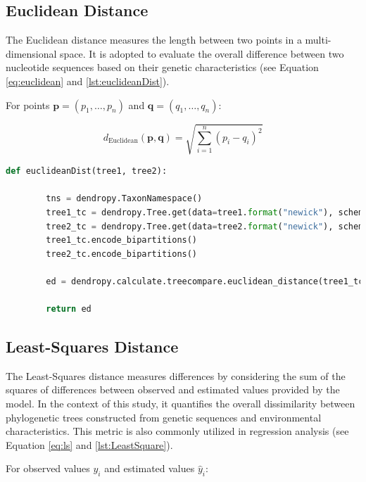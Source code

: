 \subsection{Euclidean Distance}\label{euclidean}
The Euclidean distance measures the length between two points in a multi-dimensional space. It is adopted to evaluate the overall difference between two nucleotide sequences based on their genetic characteristics (see Equation \eqref{eq:euclidean} and \autoref{lst:euclideanDist}).

For points $\mathbf{p} = (p_1, \ldots, p_n)$ and $\mathbf{q} = (q_1, \ldots, q_n)$:

\begin{equation}\label{eq:euclidean}
    d_{\text{Euclidean}}(\mathbf{p}, \mathbf{q}) = \sqrt{\sum_{i=1}^{n} (p_i - q_i)^2}
\end{equation}

\begin{lstlisting}[label=lst:euclideanDist,language=Python,caption=Python script for calculating the Euclidean distance using the ete3 package in the aPhyloGeo package]
    def euclideanDist(tree1, tree2):
        
        tns = dendropy.TaxonNamespace()
        tree1_tc = dendropy.Tree.get(data=tree1.format("newick"), schema="newick", taxon_namespace=tns)
        tree2_tc = dendropy.Tree.get(data=tree2.format("newick"), schema="newick", taxon_namespace=tns)
        tree1_tc.encode_bipartitions()
        tree2_tc.encode_bipartitions()

        ed = dendropy.calculate.treecompare.euclidean_distance(tree1_tc, tree2_tc)

        return ed
\end{lstlisting}

\subsection{Least-Squares Distance}\label{LS}
The Least-Squares distance measures differences by considering the sum of the squares of differences between observed and estimated values provided by the model. In the context of this study, it quantifies the overall dissimilarity between phylogenetic trees constructed from genetic sequences and environmental characteristics. This metric is also commonly utilized in regression analysis (see Equation \eqref{eq:ls} and \autoref{lst:LeastSquare}).

For observed values $y_i$ and estimated values $\hat{y}_i$:

